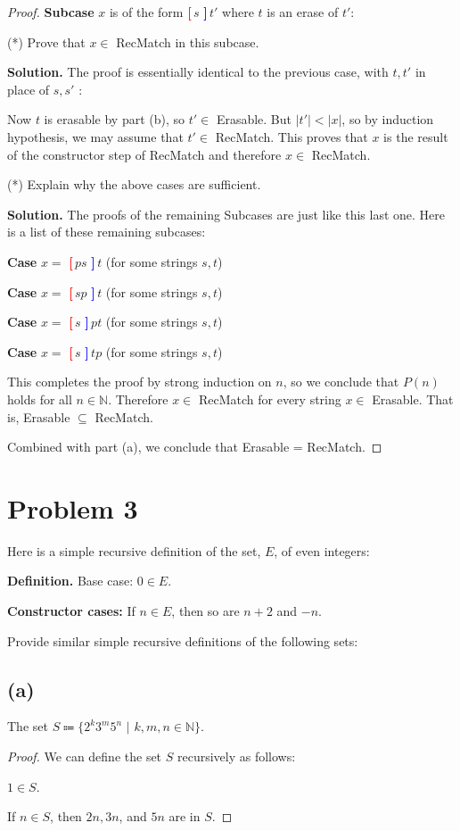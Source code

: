\documentclass[14pt]{extarticle}
\newcommand{\lbr}{\textcolor{red}{{\bf [\,}}}
\newcommand{\rbr}{\textcolor{blue}{{\bf ]\,}}}
\begin{document}
\begin{proof}
{\bf Subcase} $x$ is of the form \lbr $s$ \rbr $t'$ where $t$ is an erase of $t'$:

(*) Prove that $x \in$ RecMatch in this subcase.

{\bf Solution.} The proof is essentially identical to the previous case, with $t, t'$ in place of $s, s'$ :

Now $t$ is erasable by part (b), so $t' \in$ Erasable. But $|t'| < |x|$, so by induction hypothesis, we may assume that $t' \in$ RecMatch. This proves that $x$ is the result of the constructor
step of RecMatch and therefore $x \in$ RecMatch.

(*) Explain why the above cases are sufficient.

{\bf Solution.} The proofs of the remaining Subcases are just like this last one. Here is a list of these remaining subcases:

{\bf Case} $x =$ \lbr $ps$ \rbr $t$ (for some strings $s, t$)

{\bf Case} $x =$ \lbr $sp$ \rbr $t$ (for some strings $s, t$)

{\bf Case} $x =$ \lbr $s$ \rbr $pt$ (for some strings $s, t$)

{\bf Case} $x =$ \lbr $s$ \rbr $tp$ (for some strings $s, t$)

This completes the proof by strong induction on $n$, so we conclude that $P(n)$ holds for all $n \in \mathbb{N}$. Therefore $x \in$ RecMatch for every string $x \in$ Erasable. That is, Erasable $\subseteq$ RecMatch. 

Combined with part (a), we conclude that Erasable = RecMatch.
\end{proof}

\section{Problem 3}
Here is a simple recursive definition of the set, $E$, of even integers:


{\bf Definition.} Base case: $0 \in E$.

{\bf Constructor cases:} If $n \in E$, then so are $n + 2$ and $-n$.

Provide similar simple recursive definitions of the following sets:
\subsection{(a)}
The set $S \Coloneqq \{2^k 3^m 5^n \,\,|\,\, k, m, n \in \mathbb{N} \}$.
\begin{proof}
We can define the set $S$ recursively as follows:

$1 \in S$.

If $n \in S$, then $2n, 3n$, and $5n$ are in $S$.
\end{proof}
\end{document}
